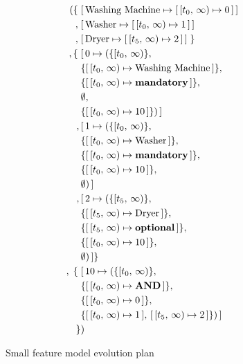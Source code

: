 \begin{figure}
  \begin{align*}
    ( \{ \; & [\,\text{Washing Machine} \mapsto [\,[t_0,\, \infty) \mapsto 0\,]\,] \\
       ,\; & [\,\text{Washer} \mapsto [\,[t_0,\, \infty) \mapsto 1\,]\,] \\
       ,\; & [\,\text{Dryer} \mapsto [\,[t_5,\, \infty) \mapsto 2\,]\,]\; \} \\
       ,\{\; & [\,0 \mapsto (\{[t_0,\, \infty)\} ,\, \\
             & \{[\,[t_0,\, \infty) \mapsto \text{Washing Machine}\,]\} ,\, \\
             & \{[\,[t_0,\, \infty) \mapsto \textbf{mandatory}\,]\} ,\, \\
             &  \emptyset ,\, \\ 
             & \{[\,[t_0,\, \infty) \mapsto 10\,]\})\,] \\
             ,\, & [\,1 \mapsto (\{[t_0,\, \infty)\} ,\, \\
             & \{[\,[t_0,\, \infty) \mapsto \text{Washer}\,]\} ,\, \\
             & \{[\,[t_0,\, \infty) \mapsto \textbf{mandatory}\,]\} ,\, \\
             &  \{[\,[t_0,\, \infty) \mapsto 10\,]\} ,\, \\ 
             & \emptyset)\,] \\
             ,\, & [\,2 \mapsto (\{[t_5,\, \infty)\} ,\, \\
             & \{[\,[t_5,\, \infty) \mapsto \text{Dryer}\,]\} ,\, \\
             & \{[\,[t_5,\, \infty) \mapsto \textbf{optional}\,]\} ,\, \\
             &  \{[\,[t_0,\, \infty) \mapsto 10\,]\} ,\, \\ 
             & \emptyset)\,] \}\\
    ,\; \{ \; & [\,10 \mapsto (\{[t_0,\, \infty)\} ,\, \\
              & \{[\,[t_0,\, \infty) \mapsto \textbf{AND}\,]\} ,\, \\
              & \{[\,[t_0,\, \infty) \mapsto 0\,]\} ,\, \\
              & \{[\,[t_0,\, \infty) \mapsto 1\,],\, [\,[t_5,\, \infty) \mapsto 2\,]\} )\,]\\
    \}&)\\
  \end{align*}
  \caption{Small feature model evolution plan}
  \label{ex:washing-machine}
\end{figure}

